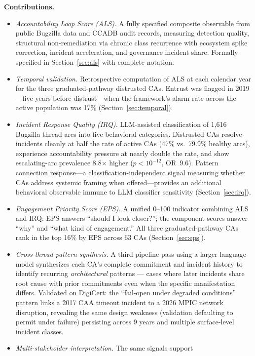 \documentclass[10pt,twocolumn,letterpaper]{article}
\begin{document}
\textbf{Contributions.}
\begin{itemize}[noitemsep,topsep=2pt]
\item \textit{Accountability Loop Score (ALS).} A fully specified composite observable
  from public Bugzilla data and CCADB audit records, measuring detection quality,
  structural non-remediation via chronic class recurrence with ecosystem spike correction,
  incident acceleration, and governance incident share. Formally specified in
  Section~\ref{sec:als} with complete notation.
\item \textit{Temporal validation.} Retrospective computation of ALS at each calendar
  year for the three graduated-pathway distrusted CAs. Entrust was flagged in 2019---five
  years before distrust---when the framework's alarm rate across the active population
  was 17\% (Section~\ref{sec:temporal}).
\item \textit{Incident Response Quality (IRQ).} LLM-assisted classification of 1,616
  Bugzilla thread arcs into five behavioral categories. Distrusted CAs resolve incidents
  cleanly at half the rate of active CAs (47\% vs.\ 79.9\% healthy arcs), experience
  accountability pressure at nearly double the rate, and show escalating-arc prevalence
  8.8$\times$ higher ($p < 10^{-12}$, OR~9.6). Pattern connection response---a
  classification-independent signal measuring whether CAs address systemic framing when
  offered---provides an additional behavioral observable immune to LLM classifier
  sensitivity (Section~\ref{sec:irq}).
\item \textit{Engagement Priority Score (EPS).} A unified 0--100 indicator combining ALS
  and IRQ: EPS answers ``should I look closer?''; the component scores answer ``why'' and
  ``what kind of engagement.'' All three graduated-pathway CAs rank in the top 16\% by EPS
  across 63 CAs (Section~\ref{sec:eps}).
\item \textit{Cross-thread pattern synthesis.} A third pipeline pass using a larger
  language model synthesizes each CA's complete commitment and incident history to
  identify recurring \textit{architectural} patterns --- cases where later incidents
  share root cause with prior commitments even when the specific manifestation differs.
  Validated on DigiCert: the ``fail-open under degraded conditions'' pattern links a
  2017 CAA timeout incident to a 2026 MPIC network disruption, revealing the same
  design weakness (validation defaulting to permit under failure) persisting across
  9 years and multiple surface-level incident classes.
\item \textit{Multi-stakeholder interpretation.} The same signals support

\end{itemize}
\end{document}
